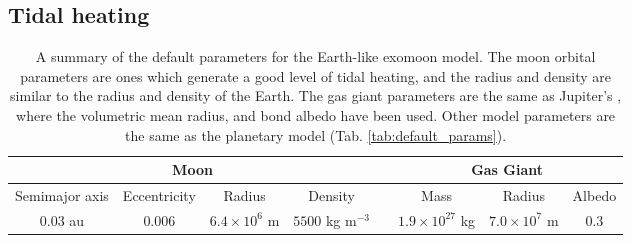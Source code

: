 \documentclass[12pt, onecolumn]{revtex4-2}    %
\begin{document}
\subsection{Tidal heating} \label{ssec:TidalHeating}
%
\begin{table*}
  \begin{tabular}{|c|c|c|c|c|c|c|c|}
    \hline
    \multicolumn{4}{|c|}{Moon} && \multicolumn{3}{c|}{Gas Giant} \\
    \hline
    Semimajor axis & Eccentricity & Radius & Density && Mass & Radius & Albedo \\
    \hline
    $0.03$ au & $0.006$ & $6.4\times 10^6$ m & $5500$ kg m$^{-3}$ && $1.9\times10^{27}$ kg & $7.0 \times 10^7$ m & 0.3 \\
    \hline
  \end{tabular}
  \caption{
    A summary of the default parameters for the Earth-like exomoon model.
    The moon orbital parameters are ones which generate a good level of tidal heating,
    and the radius and density are similar to the radius and density of the Earth.
    The gas giant parameters are the same as Jupiter's \cite{NASA_jupiter}, where the volumetric mean radius, and bond albedo have been used.
    Other model parameters are the same as the planetary model (Tab. \ref{tab:default_params}).
  }
  \label{tab:default_params_moon}
\end{table*}

\end{document}
